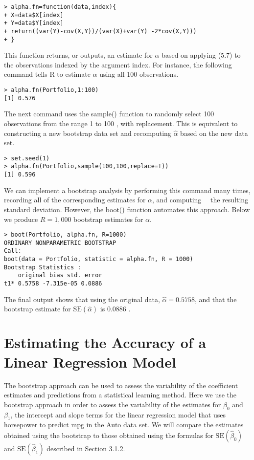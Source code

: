 \documentclass[10pt]{article}
\begin{document}
\begin{verbatim}
> alpha.fn=function(data,index){
+ X=data$X[index]
+ Y=data$Y[index]
+ return((var(Y)-cov(X,Y))/(var(X)+var(Y) -2*cov(X,Y)))
+ }
\end{verbatim}

This function returns, or outputs, an estimate for $\alpha$ based on applying (5.7) to the observations indexed by the argument index. For instance, the following command tells R to estimate $\alpha$ using all 100 observations.

\begin{verbatim}
> alpha.fn(Portfolio,1:100)
[1] 0.576
\end{verbatim}

The next command uses the sample() function to randomly select 100 observations from the range 1 to 100 , with replacement. This is equivalent to constructing a new bootstrap data set and recomputing $\hat{\alpha}$ based on the new data set.

\begin{verbatim}
> set.seed(1)
> alpha.fn(Portfolio,sample(100,100,replace=T))
[1] 0.596
\end{verbatim}

We can implement a bootstrap analysis by performing this command many times, recording all of the corresponding estimates for $\alpha$, and computing\
\
the resulting standard deviation. However, the boot() function automates this approach. Below we produce $R=1,000$ bootstrap estimates for $\alpha$.

\begin{verbatim}
> boot(Portfolio, alpha.fn, R=1000)
ORDINARY NONPARAMETRIC BOOTSTRAP
Call:
boot(data = Portfolio, statistic = alpha.fn, R = 1000)
Bootstrap Statistics :
    original bias std. error
t1* 0.5758 -7.315e-05 0.0886
\end{verbatim}

The final output shows that using the original data, $\hat{\alpha}=0.5758$, and that the bootstrap estimate for $\mathrm{SE}(\hat{\alpha})$ is 0.0886 .

\section*{Estimating the Accuracy of a Linear Regression Model}
The bootstrap approach can be used to assess the variability of the coefficient estimates and predictions from a statistical learning method. Here we use the bootstrap approach in order to assess the variability of the estimates for $\beta_{0}$ and $\beta_{1}$, the intercept and slope terms for the linear regression model that uses horsepower to predict mpg in the Auto data set. We will compare the estimates obtained using the bootstrap to those obtained using the formulas for $\mathrm{SE}\left(\hat{\beta}_{0}\right)$ and $\mathrm{SE}\left(\hat{\beta}_{1}\right)$ described in Section 3.1.2.
\end{document}
